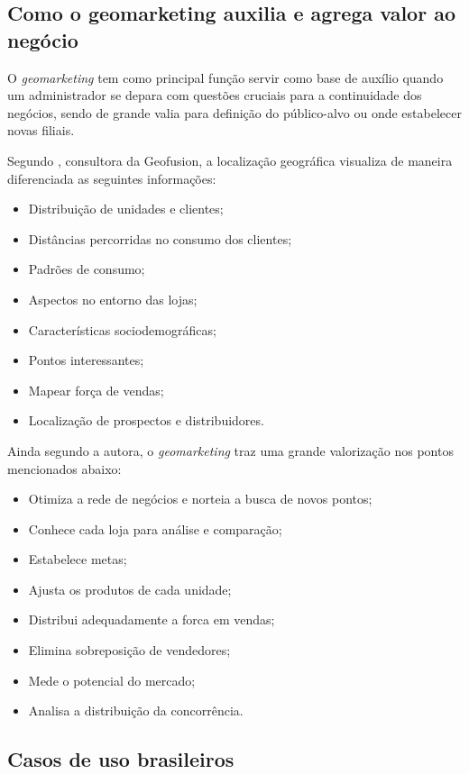\subsection{Como o geomarketing auxilia e agrega valor ao negócio}
\label{importancia}
O \emph{geomarketing} tem como principal função servir como base de auxílio quando um administrador se depara com questões cruciais para a continuidade dos negócios, sendo de grande valia para definição do público-alvo ou onde estabelecer novas filiais.

Segundo , consultora da Geofusion, a localização geográfica visualiza de maneira diferenciada as seguintes informações:

\begin{itemize}
  \item Distribuição de unidades e clientes;
  \item Distâncias percorridas no consumo dos clientes;
  \item Padrões de consumo;
  \item Aspectos no entorno das lojas;
  \item Características sociodemográficas;
  \item Pontos interessantes;
  \item Mapear força de vendas;
  \item Localização de prospectos e distribuidores.
\end{itemize}

Ainda segundo a autora, o \emph{geomarketing} traz uma grande valorização nos pontos mencionados abaixo:

\begin{itemize}
  \item Otimiza a rede de negócios e norteia a busca de novos pontos;
  \item Conhece cada loja para análise e comparação;
  \item Estabelece metas;
  \item Ajusta os produtos de cada unidade;
  \item Distribui adequadamente a forca em vendas;
  \item Elimina sobreposição de vendedores;
  \item Mede o potencial do mercado;
  \item Analisa a distribuição da concorrência.
\end{itemize}

\subsection{Casos de uso brasileiros}

